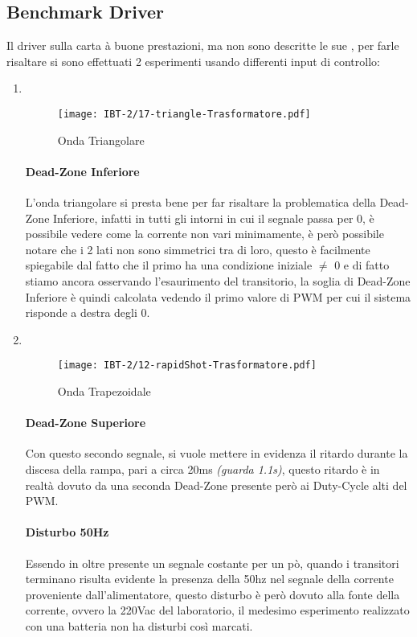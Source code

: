 \subsection{Benchmark Driver}
Il driver sulla carta à buone prestazioni, ma non sono descritte le sue \nonLinearita, per farle risaltare si sono effettuati 2 esperimenti usando differenti input di controllo:
\begin{enumerate}
	\item {} \\ \vspace{-11mm}
	      \begin{figure}[h]
		      \centering
		      \texttt{[image: IBT-2/17-triangle-Trasformatore.pdf]}
		      \caption[Esperimento con Onda Triangolare]{Onda Triangolare}
	      \end{figure}\vspace{-10mm}
	      \paragraph{Dead-Zone Inferiore} L'onda triangolare si presta bene per far risaltare la problematica della Dead-Zone Inferiore, infatti in tutti gli intorni in cui il segnale passa per 0, è possibile vedere come la corrente non vari minimamente, è però possibile notare che i 2 lati non sono simmetrici tra di loro, questo è facilmente spiegabile dal fatto che il primo ha una condizione iniziale $ \neq $ 0 e di fatto stiamo ancora osservando l'esaurimento del transitorio, la soglia di Dead-Zone Inferiore è quindi calcolata vedendo il primo valore di PWM  per cui il sistema risponde a destra degli 0.      
	      
	      \newpage
	\item {} \\
	      \begin{figure}[h]
		      \centering
		      \texttt{[image: IBT-2/12-rapidShot-Trasformatore.pdf]}
		      \caption[Esperimento con Onda Trapezoidale]{Onda Trapezoidale}
	      \end{figure}  \vspace{-10mm}
	      \paragraph{Dead-Zone Superiore} Con questo secondo segnale, si vuole mettere in evidenza il ritardo durante la discesa della rampa, pari a circa 20ms {\small \textit{(guarda 1.1s)}}, questo ritardo è in realtà dovuto da una seconda Dead-Zone presente però ai Duty-Cycle alti del PWM.
	      \vspace{-5mm}
	      \paragraph{Disturbo 50Hz} Essendo in oltre presente un segnale costante per un pò, quando i transitori terminano risulta evidente la presenza della 50hz nel segnale della corrente proveniente dall'alimentatore, questo disturbo è però dovuto alla fonte della corrente, ovvero la 220Vac del laboratorio, il medesimo esperimento realizzato con una batteria non ha disturbi così marcati.
\end{enumerate}
